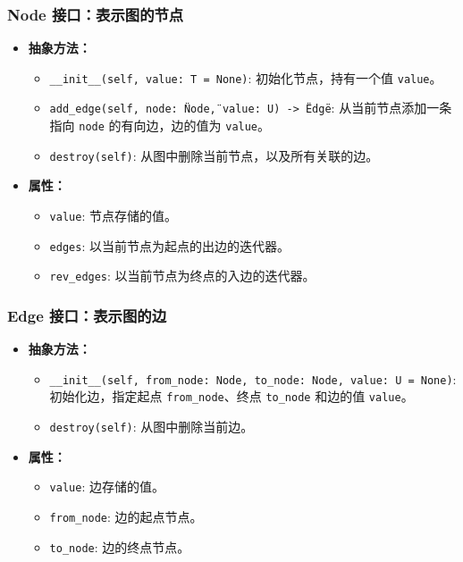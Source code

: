 \documentclass[10pt]{article}
\begin{document}
    \subsubsection{Node 接口：表示图的节点}
    \begin{itemize}[label=\textbullet]
        \item \textbf{抽象方法：}
        \begin{itemize}[label=\textbullet]
            \item \texttt{\_\_init\_\_(self, value: T = None)}: 初始化节点，持有一个值 \texttt{value}。
            \item \texttt{add\_edge(self, node: \"Node\", value: U) -> \"Edge\"}: 从当前节点添加一条指向 \texttt{node} 的有向边，边的值为 \texttt{value}。
            \item \texttt{destroy(self)}: 从图中删除当前节点，以及所有关联的边。
        \end{itemize}
        \item \textbf{属性：}
        \begin{itemize}[label=\textbullet]
            \item \texttt{value}: 节点存储的值。
            \item \texttt{edges}: 以当前节点为起点的出边的迭代器。
            \item \texttt{rev\_edges}: 以当前节点为终点的入边的迭代器。
        \end{itemize}
    \end{itemize}

    \subsubsection{Edge 接口：表示图的边}
    \begin{itemize}[label=\textbullet]
        \item \textbf{抽象方法：}
        \begin{itemize}[label=\textbullet]
            \item \texttt{\_\_init\_\_(self, from\_node: Node, to\_node: Node, value: U = None)}: 初始化边，指定起点 \texttt{from\_node}、终点 \texttt{to\_node} 和边的值 \texttt{value}。
            \item \texttt{destroy(self)}: 从图中删除当前边。
        \end{itemize}
        \item \textbf{属性：}
        \begin{itemize}[label=\textbullet]
            \item \texttt{value}: 边存储的值。
            \item \texttt{from\_node}: 边的起点节点。
            \item \texttt{to\_node}: 边的终点节点。
        \end{itemize}
    \end{itemize}
\end{document}
